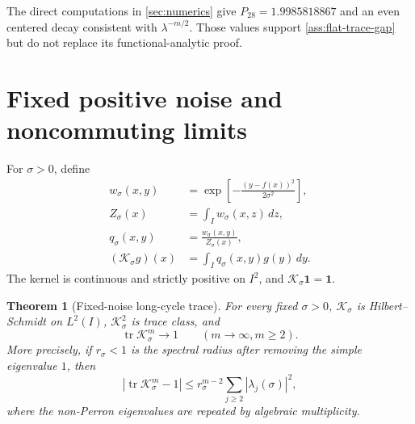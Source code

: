 \documentclass[11pt]{article}
\newtheorem{theorem}{Theorem}[section]
\theoremstyle{definition}
\theoremstyle{remark}
\newcommand{\cK}{\mathcal K}
\newcommand{\tr}{\operatorname{tr}}
\newcommand{\one}{\mathbf 1}
\begin{document}
The direct computations in \cref{sec:numerics} give
$P_{28}=1.9985818867$ and an even centered decay consistent with
$\lambda^{-m/2}$.  Those values support \cref{ass:flat-trace-gap} but do not
replace its functional-analytic proof.

\section{Fixed positive noise and noncommuting limits}
\label{sec:noncommuting}

For $\sigma>0$, define
\begin{align}
 w_\sigma(x,y)&=
 \exp\left[-\frac{(y-f(x))^2}{2\sigma^2}\right],\label{eq:gaussian-weight}\\
 Z_\sigma(x)&=\int_Iw_\sigma(x,z)\,dz,\label{eq:normalizer}\\
 q_\sigma(x,y)&=\frac{w_\sigma(x,y)}{Z_\sigma(x)},\label{eq:kernel}\\
 (\cK_\sigma g)(x)&=\int_Iq_\sigma(x,y)g(y)\,dy.
 \label{eq:operator}
\end{align}
The kernel is continuous and strictly positive on $I^2$, and
$\cK_\sigma\one=\one$.

\begin{theorem}[Fixed-noise long-cycle trace]
\label{thm:fixed-noise-trace}
For every fixed $\sigma>0$, $\cK_\sigma$ is Hilbert--Schmidt on $L^2(I)$,
$\cK_\sigma^2$ is trace class, and
\begin{equation}\label{eq:fixed-noise-limit}
 \tr\cK_\sigma^m\longrightarrow1
 \qquad(m\to\infty, m\ge2).
\end{equation}
More precisely, if $r_\sigma<1$ is the spectral radius after removing the
simple eigenvalue $1$, then
\begin{equation}\label{eq:fixed-noise-rate}
 |\tr\cK_\sigma^m-1|
 \le r_\sigma^{m-2}
 \sum_{j\ge2}|\lambda_j(\sigma)|^2,
\end{equation}
where the non-Perron eigenvalues are repeated by algebraic multiplicity.
\end{theorem}
\end{document}
